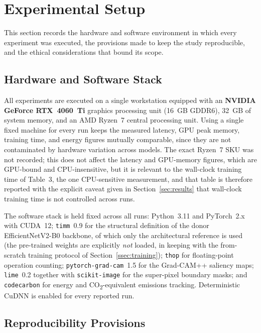 \section{Experimental Setup}\label{sec:setup}

This section records the hardware and software environment in which every
experiment was executed, the provisions made to keep the study
reproducible, and the ethical considerations that bound its scope.

\subsection{Hardware and Software Stack}\label{ssec:hardware}

All experiments are executed on a single workstation equipped with an
\textbf{NVIDIA GeForce RTX~4060~Ti} graphics processing unit (16~GB GDDR6),
32~GB of system memory, and an AMD Ryzen~7 central processing unit. Using a
single fixed machine for every run keeps the measured latency, GPU peak
memory, training time, and energy figures mutually comparable, since they
are not contaminated by hardware variation across models. The exact Ryzen~7
SKU was not recorded; this does not affect the latency and GPU-memory
figures, which are GPU-bound and CPU-insensitive, but it is relevant to the
wall-clock training time of Table~3, the one CPU-sensitive measurement, and
that table is therefore reported with the explicit caveat given in
Section~\ref{sec:results} that wall-clock training time is not controlled
across runs.

The software stack is held fixed across all runs: Python~3.11 and
PyTorch~2.x with CUDA~12; \texttt{timm}~0.9 for the structural definition of
the donor EfficientNetV2-B0 backbone, of which only the architectural reference
is used (the pre-trained weights are explicitly \emph{not} loaded, in
keeping with the from-scratch training protocol of
Section~\ref{ssec:training}); \texttt{thop} for floating-point operation
counting; \texttt{pytorch-grad-cam}~1.5 for the Grad-CAM++ saliency maps;
\texttt{lime}~0.2 together with \texttt{scikit-image} for the super-pixel
boundary masks; and \texttt{codecarbon} for energy and
CO\textsubscript{2}-equivalent emissions tracking. Deterministic CuDNN is
enabled for every reported run.

\subsection{Reproducibility Provisions}\label{ssec:reproducibility}

